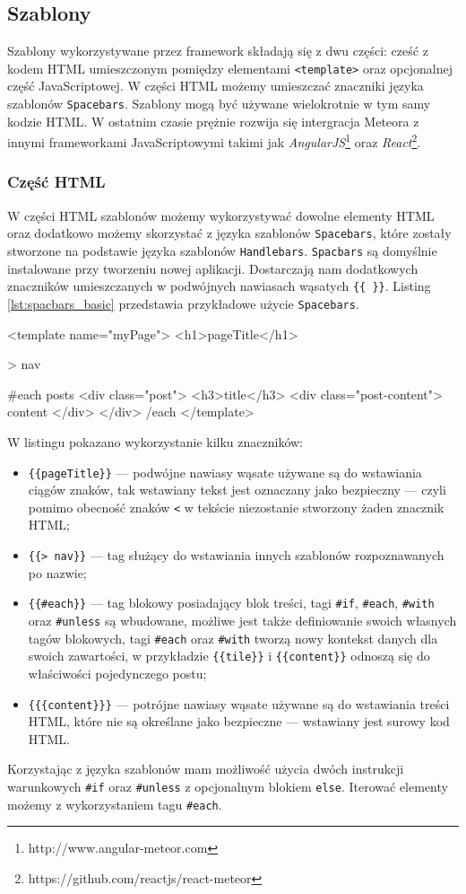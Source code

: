   \subsection{Szablony}
Szablony wykorzystywane przez framework składają się z dwu części: cześć z kodem HTML umieszczonym pomiędzy elementami \verb|<template>| oraz opcjonalnej część JavaScriptowej. W części HTML możemy umieszczać znaczniki języka szablonów \verb|Spacebars|. Szablony mogą być używane wielokrotnie w tym samy kodzie HTML. W ostatnim czasie prężnie rozwija się intergracja Meteora z innymi frameworkami JavaScriptowymi takimi jak \emph{AngularJS}\footnote{http://www.angular-meteor.com} oraz \emph{React}\footnote{https://github.com/reactjs/react-meteor}. 
    \subsubsection{Część HTML}
W części HTML szablonów możemy wykorzystywać dowolne elementy HTML oraz dodatkowo możemy skorzystać z języka szablonów \verb|Spacebars|, które zostały stworzone na podstawie języka szablonów \verb|Handlebars|. \verb|Spacbars| są domyślnie instalowane przy tworzeniu nowej aplikacji. Dostarczają nam dodatkowych znaczników umieszczanych w podwójnych nawiasach wąsatych \verb|{{ }}|. Listing \ref{lst:spacbars_basic} przedstawia przykładowe użycie \verb|Spacebars|.
\begin{html}[caption={{\textit{Spacebars}}},label={lst:spacbars_basic}]
<template name="myPage">
  <h1>{{pageTitle}}</h1>

  {{> nav}}

  {{#each posts}}
    <div class="post">
      <h3>{{title}}</h3>
      <div class="post-content">
        {{{content}}}
      </div>
    </div>
  {{/each}}
</template>
\end{html}
W listingu pokazano wykorzystanie kilku znaczników:
\begin{itemize}
 \item \verb|{{pageTitle}}| --- podwójne nawiasy wąsate używane są do wstawiania ciągów znaków, tak wstawiany tekst jest oznaczany jako bezpieczny --- czyli pomimo obecność znaków \verb|<| w tekście niezostanie stworzony żaden znacznik HTML;
 \item \verb|{{> nav}}| --- tag służący do wstawiania innych szablonów rozpoznawanych po nazwie;
 \item \verb|{{#each}}| --- tag blokowy posiadający blok treści, tagi \verb|#if|, \verb|#each|, \verb|#with| oraz \verb|#unless| są wbudowane, możliwe jest także definiowanie swoich własnych tagów blokowych, tagi \verb|#each| oraz \verb|#with| tworzą nowy kontekst danych dla swoich zawartości, w przykładzie \verb|{{tile}}| i \verb|{{content}}| odnoszą się do właściwości pojedynczego postu;
 \item \verb|{{{content}}}| --- potrójne nawiasy wąsate używane są do wstawiania treści HTML, które nie są określane jako bezpieczne --- wstawiany jest surowy kod HTML. 
\end{itemize}
Korzystając z języka szablonów mam możliwość użycia dwóch instrukcji warunkowych \verb|#if| oraz \verb|#unless| z opcjonalnym blokiem \verb|else|. Iterować elementy możemy z wykorzystaniem tagu \verb|#each|. 

